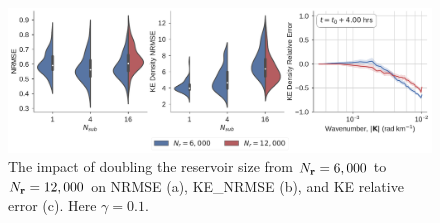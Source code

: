 \begin{figure}
    \centering
    \includegraphics[width=\textwidth]{../figures/rc_reservoir_size.pdf}
    \caption{The impact of doubling the reservoir size from $N_{\mathbf{r}}=6,000$ to
        $N_{\mathbf{r}}=12,000$ on NRMSE (a), KE\_NRMSE (b), and KE relative error (c).
        Here $\gamma=0.1$.
    }
    \label{fig:esn-size}
\end{figure}

